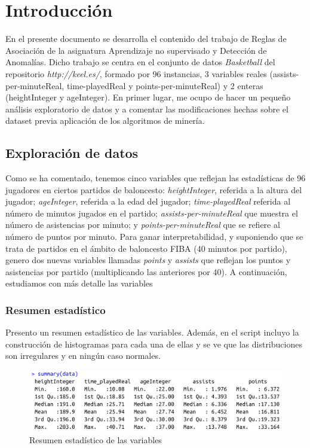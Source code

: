 \section{Introducción}

En el presente documento se desarrolla el contenido del trabajo de Reglas de Asociación de la asignatura Aprendizaje no supervisado y Detección de Anomalías. Dicho trabajo se centra en el conjunto de datos \textit{Basketball} del repositorio \textit{http://keel.es/}, formado por 96 instancias, 3 variables reales (assists-per-minuteReal, time-playedReal y points-per-minuteReal) y 2 enteras (heightInteger y ageInteger). En primer lugar, me ocupo de hacer un pequeño análisis exploratorio de datos y a comentar las modificaciones hechas sobre el dataset previa aplicación de los algoritmos de minería.

\subsection{Exploración de datos}

Como se ha comentado, tenemos cinco variables que reflejan las estadísticas de 96 jugadores en ciertos partidos de baloncesto:  \textit{heightInteger}, referida a la altura del jugador; \textit{ageInteger}, referida a la edad del jugador;  \textit{time-playedReal} referida al número de minutos jugados en el partido; \textit{assists-per-minuteReal} que muestra el número de asistencias por minuto; y \textit{points-per-minuteReal} que se refiere al número de puntos por minuto. Para ganar interpretabilidad, y suponiendo que se trata de partidos en el ámbito de baloncesto FIBA (40 minutos por partido), genero dos nuevas variables llamadas \textit{points} y \textit{assists} que reflejan los puntos y asistencias por partido (multiplicando las anteriores por 40). A continuación, estudiamos con más detalle las variables

\subsubsection{Resumen estadístico}

Presento un resumen estadístico de las variables. Además, en el script incluyo la construcción de histogramas para cada una de ellas y se ve que las distribuciones son irregulares y en ningún caso normales.

\begin{figure}[H] %
	\centering
	\includegraphics[scale=0.3]{summary.png}  %
	\caption{Resumen estadístico de las variables} 
	\label{fig:summary}
\end{figure}

